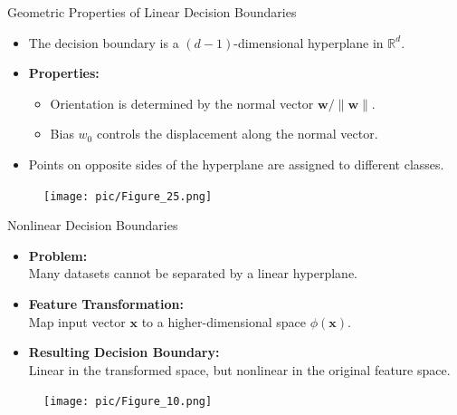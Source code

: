 \documentclass[serif, aspectratio=169]{beamer}
\begin{document}
    \begin{frame}{Geometric Properties of Linear Decision Boundaries}
        \begin{itemize}\itemsep1.2em
        \item The decision boundary is a $(d-1)$-dimensional hyperplane in $\mathbb{R}^d$.
        \item \textbf{Properties:}
        \begin{itemize}
            \item Orientation is determined by the normal vector $\mathbf{w}/\|\mathbf{w}\|$.
            \item Bias $w_0$ controls the displacement along the normal vector.
        \end{itemize}
        \item Points on opposite sides of the hyperplane are assigned to different classes.
        \end{itemize}
        \begin{figure}
            \texttt{[image: pic/Figure\_25.png]}
        \end{figure}
    \end{frame}

    \begin{frame}{Nonlinear Decision Boundaries}
        \begin{itemize}\itemsep1em
        \item \textbf{Problem:}\\ Many datasets cannot be separated by a linear hyperplane.
        \item \textbf{Feature Transformation:}\\ Map input vector $\mathbf{x}$ to a higher-dimensional space $\phi(\mathbf{x})$.
        \item \textbf{Resulting Decision Boundary:}\\ Linear in the transformed space, but nonlinear in the original feature space.
        \end{itemize}
        \endminipage
        \hfill
        \begin{figure}
            \texttt{[image: pic/Figure\_10.png]}
        \end{figure}
        \endminipage
        \vfill
    \end{frame}
\end{document}
